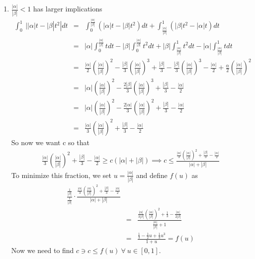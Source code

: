 \documentclass[11pt]{SelfArxOneColBMN}
\begin{document}
\begin{solution}
\begin{enumerate}
    \item $\frac{|\alpha|}{|\beta|} < 1$ has larger implications
    \begin{eqnarray*}
      \int_0^1 \:  ||\alpha| t - |\beta| t^2| dt 
      &=&
      \int_0^\frac{|\alpha|}{|\beta|} (|\alpha|t - |\beta|t^2) dt + \int_{\frac{|\alpha|}{|\beta|}}^1 (|\beta| t^2 - |\alpha|t) dt\\
      &=& |\alpha|\int_0^{\frac{|\alpha|}{|\beta|}}t dt - |\beta|\int_0^{\frac{|\alpha|}{|\beta|}}t^2 dt + |\beta|\int_{\frac{|\alpha|}{|\beta|}}^1 t^2 dt - |\alpha|\int_{\frac{|\alpha|}{|\beta|}}^1 t dt\\
      &=&\frac{|\alpha|}{2}(\frac{|\alpha|}{|\beta|})^2 - \frac{|\beta|}{3}(\frac{|\alpha|}{|\beta|})^3 + \frac{|\beta|}{3} - \frac{|\beta|}{3}(\frac{|\alpha|}{|\beta|})^3 - \frac{|\alpha|}{2} + \frac{\alpha}{2}(\frac{|\alpha|}{|\beta|})^2\\
      &=& |\alpha|(\frac{|\alpha|}{|\beta|})^2 - \frac{2|\beta|}{3}(\frac{|\alpha|}{|\beta|})^3 + \frac{|\beta|}{3} - \frac{|\alpha|}{2}\\
      &=& |\alpha|(\frac{|\alpha|}{|\beta|})^2 - \frac{2|\alpha|}{3}(\frac{|\alpha|}{|\beta|})^2 + \frac{|\beta|}{3} - \frac{|\alpha|}{2}\\
      &=& \frac{|\alpha|}{3}(\frac{|\alpha|}{|\beta|})^2 +\frac{|\beta|}{3} - \frac{|\alpha|}{2}
    \end{eqnarray*}
    So now we want c so that
    \begin{eqnarray*}
      \frac{|\alpha|}{3}(\frac{|\alpha|}{|\beta|})^2 +\frac{|\beta|}{3} - \frac{|\alpha|}{2} \geq c(|\alpha| + |\beta|)
      \implies c \leq \frac{\frac{|\alpha|}{3}(\frac{|\alpha|}{|\beta|})^2 +\frac{|\beta|}{3} - \frac{|\alpha|}{2}}{|\alpha| + |\beta|}
    \end{eqnarray*}
    To minimize this fraction, we set $u  = \frac{|\alpha|}{|\beta|}$ and define $f(u)$ as
    \begin{eqnarray*}
      \frac{\frac{1}{|\beta|}}{\frac{1}{|\beta|}} \cdot \frac{\frac{|\alpha|}{3}(\frac{|\alpha|}{|\beta|})^2 +\frac{|\beta|}{3} - \frac{|\alpha|}{2}}{|\alpha| + |\beta|}\\
      &=& \frac{\frac{|\alpha|}{3|\beta|}(\frac{|\alpha|}{|\beta|})^2 +\frac{1}{3} - \frac{|\alpha|}{2|\beta|}}{\frac{|\alpha|}{|\beta|} + 1}\\
      &=& \frac{\frac{1}{3} - \frac{1}{2}u + \frac{1}{3}u^3}{1 + u} = f(u)
    \end{eqnarray*}
    Now we need to find $c \ni c \leq f(u) \: \forall \: u \in [0,1]$. 

\end{enumerate}
\end{solution}
\end{document}

